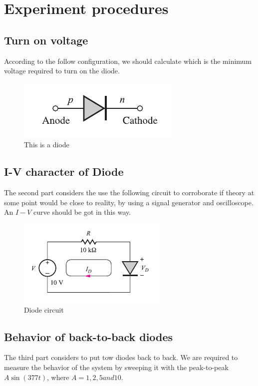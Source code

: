 \documentclass{article}
\begin{document}
\section{Experiment procedures}

\subsection{Turn on voltage}
According to the follow configuration, we should calculate which is the minimum voltage required to turn on the diode.

\begin{figure}[htbp]
	\centering
	\includegraphics[width=0.5\linewidth]{imgs/intro-1.png}
	\caption{This is a diode}
	\label{fig-intro-1}
\end{figure}

\subsection{I-V character of Diode}
The second part considers the use the following circuit to corroborate if theory at some point would be close to reality, by using a signal generator and oscilloscope. An $I-V$ curve should be got in this way.

\begin{figure}[htbp]
	\centering
	\includegraphics[width=0.5\linewidth]{imgs/intro-2.png}
	\caption{Diode circuit}
	\label{fig-intro-2}
\end{figure}

\subsection{Behavior of back-to-back diodes}
The third part considers to put tow diodes back to back. We are required to measure the behavior of the system by sweeping it with the peak-to-peak
 $A\sin(377t)$, where $A=1,2,5 and 10$.
\end{document}

